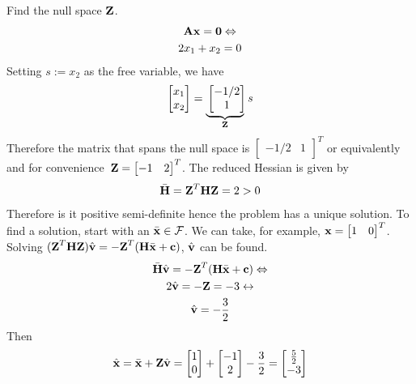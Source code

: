 \documentclass[a4paper]{article}
\numberwithin{equation}{section} %
\newcounter{example}
\newcounter{solution}
\newcommand{\myunderbrace}[2]{\mathrlap{\underbrace{\phantom{#1}}_{#2}}
      #1}
\newcommand{\B}[1]{\textbf{\textup{#1}}} %
\begin{document}
\begin{TheSolution}
Find the null space $\B{Z}$.
\[
\begin{gathered}
\B{Ax}=\B{0} \Leftrightarrow \\
2x_1+x_2=0
\end{gathered}
\]
Setting $s:=x_2$ as the free variable, we have
\[
\begin{bmatrix}x_1 \\ x_2 \end{bmatrix} = \myunderbrace{\begin{bmatrix}-1/2 \\ 1\end{bmatrix}}{\B{Z}}
s 
\]
Therefore the matrix that spans the null space is $\begin{bmatrix}-1/2 & 1\end{bmatrix}^T$ or equivalently and for convenience\ $\B{Z}=\begin{bmatrix}-1 & 2\end{bmatrix}^T$.
The reduced Hessian is given by
\[
\bar{\B{H}}=\B{Z}^T\B{HZ}=2>0
\]
Therefore is it positive semi-definite hence the problem has a unique solution. To find a solution, start with an $\bar{\B{x}}\in \mathcal{F}$. We can take, for example, $\B{x}=\begin{bmatrix}1 & 0 \end{bmatrix}^T$.\\
Solving $(\B{\textup{Z}}^T\B{\textup{HZ}})\hat{\B{\textup{v}}} = -\B{\textup{Z}}^T(\B{\textup{H}}\bar{\B{x}}+ \B{\textup{c}})$, $\hat{\B{v}}$ can be found.
\[
\begin{gathered}
\bar{\B{H}}\hat{\B{\textup{v}}} = -\B{\textup{Z}}^T(\B{\textup{H}}\bar{\B{x}}+ \B{\textup{c}}) \Leftrightarrow \\
2\hat{\B{\textup{v}}} = -\B{Z}=-3 \leftrightarrow \\
\hat{\B{\textup{v}}} = -\frac{3}{2}
\end{gathered}
\]
Then
\[
\hat{\B{\textup{x}}}=\bar{\B{\textup{x}}} + \B{Z}\hat{\B{v}} = 
\begin{bmatrix}1 \\ 0 \end{bmatrix} + 
\begin{bmatrix}-1 \\ 2 \end{bmatrix} -\frac{3}{2} = 
\begin{bmatrix}\tfrac{5}{2} \\ -3 \end{bmatrix}
\]
\end{TheSolution}
\end{document}
